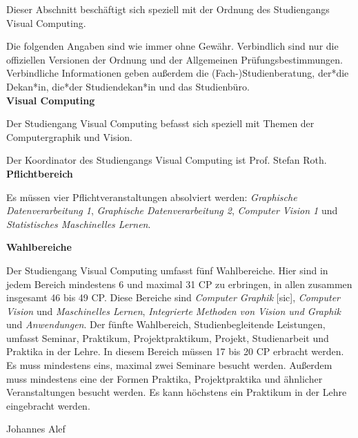 {Dieser Abschnitt beschäftigt sich speziell mit der Ordnung des Studiengangs Visual Computing.
}{
    Die folgenden Angaben sind wie immer ohne Gewähr. Verbindlich sind nur die offiziellen Versionen der Ordnung und der Allgemeinen Prüfungsbestimmungen. Verbindliche Informationen geben außerdem die (Fach-)Studienberatung, der*die Dekan*in, die*der Studiendekan*in und das Studienbüro.\\

    \noindent\textbf{Visual Computing}

    Der Studiengang Visual Computing befasst sich speziell mit Themen der Computergraphik und Vision.

    Der Koordinator des Studiengangs Visual Computing ist Prof. Stefan Roth.\\

    \noindent\textbf{Pflichtbereich}

    Es müssen vier Pflichtveranstaltungen absolviert werden: \textit{Graphische Datenverarbeitung 1}, \textit{Graphische Datenverarbeitung 2}, \textit{Computer Vision 1} und \textit{Statistisches Maschinelles Lernen}.\\
    \columnbreak

    \begin{minipage}{\columnwidth}
        \noindent\textbf{Wahlbereiche}

        Der Studiengang Visual Computing umfasst fünf Wahlbereiche. Hier sind in jedem Bereich mindestens 6 und maximal 31 CP zu erbringen, in allen zusammen insgesamt 46 bis 49 CP. Diese Bereiche sind \textit{Computer Graphik} [sic], \textit{Computer Vision} und \textit{Maschinelles Lernen}, \textit{Integrierte Methoden von Vision und Graphik} und \textit{Anwendungen}. Der fünfte Wahlbereich, Studienbegleitende Leistungen, umfasst Seminar, Praktikum, Projektpraktikum, Projekt, Studienarbeit und Praktika in der Lehre. In diesem Bereich müssen 17 bis 20 CP erbracht werden. Es muss mindestens eins, maximal zwei Seminare besucht werden. Außerdem muss mindestens eine der Formen Praktika, Projektpraktika und ähnlicher Veranstaltungen besucht werden. Es kann höchstens ein Praktikum in der Lehre eingebracht werden.\\
    \end{minipage}
}
{Johannes Alef}
